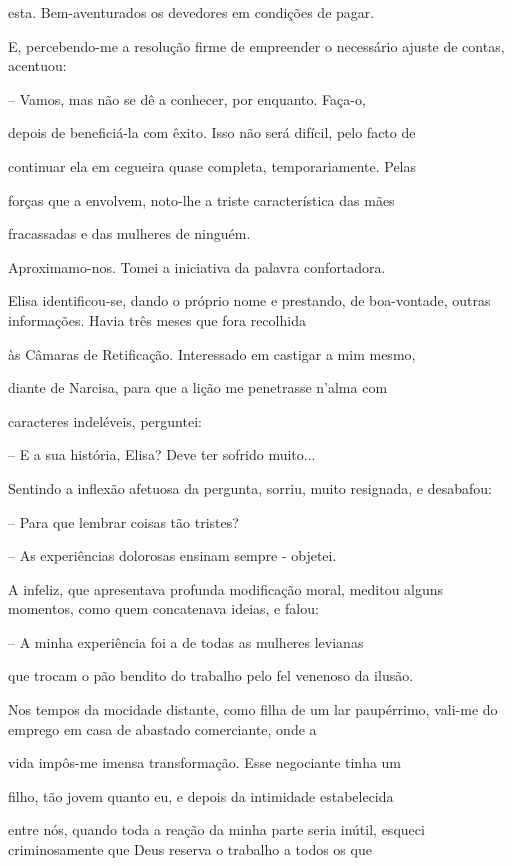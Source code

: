 \documentclass[portuguese,12pt,a4paper]{scrbook}
\begin{document}
	esta. Bem-aventurados os devedores em condições de pagar.
	
	E, percebendo-me a resolução firme de empreender o necessário ajuste de contas, acentuou:
	
	– Vamos, mas não se dê a conhecer, por enquanto. Faça-o,
	
	depois de beneficiá-la com êxito. Isso não será difícil, pelo facto de
	
	continuar ela em cegueira quase completa, temporariamente. Pelas
	
	forças que a envolvem, noto-lhe a triste característica das mães
	
	fracassadas e das mulheres de ninguém.
	
	
	Aproximamo-nos. Tomei a iniciativa da palavra confortadora.
	
	Elisa identificou-se, dando o próprio nome e prestando, de boa-vontade, outras informações. Havia três meses que fora recolhida
	
	às Câmaras de Retificação. Interessado em castigar a mim mesmo,
	
	diante de Narcisa, para que a lição me penetrasse n’alma com
	
	caracteres indeléveis, perguntei:
	
	– E a sua história, Elisa? Deve ter sofrido muito...
	
	Sentindo a inflexão afetuosa da pergunta, sorriu, muito resignada, e desabafou:
	
	– Para que lembrar coisas tão tristes?
	
	– As experiências dolorosas ensinam sempre - objetei.
	
	A infeliz, que apresentava profunda modificação moral, meditou alguns momentos, como quem concatenava ideias, e falou:
	
	– A minha experiência foi a de todas as mulheres levianas
	
	que trocam o pão bendito do trabalho pelo fel venenoso da ilusão.
	
	Nos tempos da mocidade distante, como filha de um lar paupérrimo, vali-me do emprego em casa de abastado comerciante, onde a
	
	vida impôs-me imensa transformação. Esse negociante tinha um
	
	filho, tão jovem quanto eu, e depois da intimidade estabelecida
	
	entre nós, quando toda a reação da minha parte seria inútil, esqueci criminosamente que Deus reserva o trabalho a todos os que
	
\end{document}
